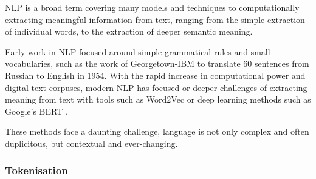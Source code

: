 NLP is a broad term covering many models and techniques to computationally extracting meaningful information from text, ranging from the simple extraction of individual words, to the extraction of deeper semantic meaning. 

Early work in NLP focused around simple grammatical rules and small vocabularies, such as the work of Georgetown-IBM  to translate 60 sentences from Russian to English in 1954. With the rapid increase in computational power and digital text corpuses, modern NLP has focused or deeper challenges of extracting meaning from text with tools such as Word2Vec  or deep learning methods such as Google's BERT .

These methods face a daunting challenge, language is not only complex and often duplicitous, but contextual and ever-changing. 

\subsubsection{Tokenisation} 

